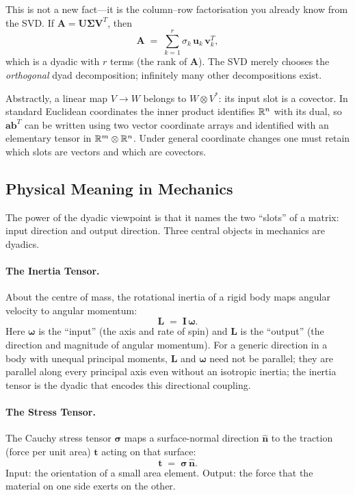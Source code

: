 This is not a new fact---it is the column--row factorisation you
already know from the SVD\@.  If
$\mathbf{A}=\mathbf{U}\boldsymbol{\Sigma}\mathbf{V}^{T}$, then
\[
  \mathbf{A}
  \;=\;
  \sum_{k=1}^{r}\sigma_{k}\,\mathbf{u}_{k}\,\mathbf{v}_{k}^{T},
\]
which is a dyadic with $r$ terms (the rank of $\mathbf{A}$).  The SVD
merely chooses the \emph{orthogonal} dyad decomposition; infinitely
many other decompositions exist.

Abstractly, a linear map $V\to W$ belongs to $W\otimes V^*$: its input slot is a covector. In standard Euclidean coordinates the inner product identifies $\mathbb{R}^n$ with its dual, so $\mathbf a\mathbf b^T$ can be written using two vector coordinate arrays and identified with an elementary tensor in $\mathbb{R}^m\otimes\mathbb{R}^n$. Under general coordinate changes one must retain which slots are vectors and which are covectors.

\subsection{Physical Meaning in Mechanics}
\label{subsec:dyadics-mechanics}

The power of the dyadic viewpoint is that it names the two ``slots''
of a matrix: input direction and output direction.  Three central
objects in mechanics are dyadics.

\paragraph{The Inertia Tensor.}
About the centre of mass, the rotational inertia of a rigid body maps angular velocity to angular momentum:
\begin{equation}\label{eq:inertia-dyadic-map}
  \mathbf{L} \;=\; \mathbf{I}\,\boldsymbol{\omega}.
\end{equation}
Here $\boldsymbol{\omega}$ is the ``input'' (the axis and rate of
spin) and $\mathbf{L}$ is the ``output'' (the direction and magnitude
of angular momentum).  For a generic direction in a body with unequal principal moments,
$\mathbf{L}$ and $\boldsymbol{\omega}$ need not be parallel; they are parallel along every principal axis even without an isotropic inertia;
the inertia tensor is the dyadic that encodes this directional coupling.

\paragraph{The Stress Tensor.}
The Cauchy stress tensor $\boldsymbol{\sigma}$ maps a surface-normal
direction $\hat{\mathbf{n}}$ to the traction (force per unit area)
$\mathbf{t}$ acting on that surface:
\[
  \mathbf{t} \;=\; \boldsymbol{\sigma}\,\hat{\mathbf{n}}.
\]
Input: the orientation of a small area element.  Output: the force
that the material on one side exerts on the other.

